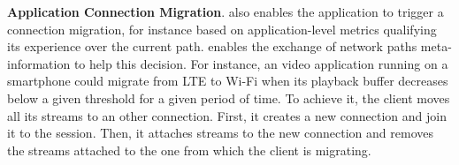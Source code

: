 \textbf{Application Connection Migration}. \tcpls also enables the application
to trigger a connection migration, for instance based on application-level 
metrics qualifying its experience over the current path. %
\tcpls enables the exchange of network paths meta-information to help this 
decision.
For instance, an video application running on a smartphone could migrate from 
LTE to Wi-Fi when its playback buffer decreases below a given threshold for a 
given period of time.
To achieve it, the client moves all its \tcpls streams to an other \tcp 
connection.
First, it creates a new \tcp connection and join it to the 
\tcpls
session. Then, %
it attaches streams to the new
connection 
and removes the streams attached to
the one from which the client is migrating. 

